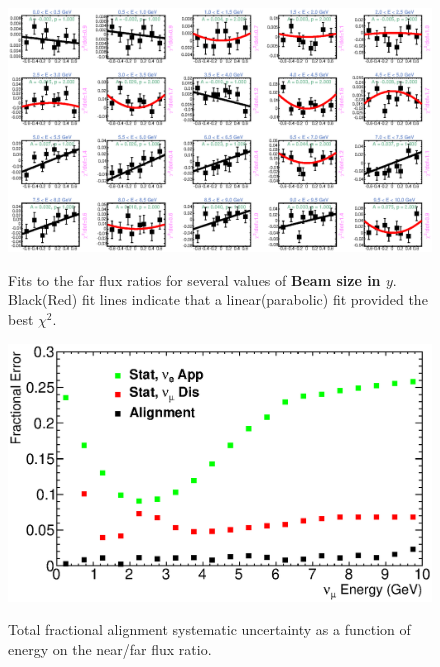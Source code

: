 {\begin{figure}[ht]
  \begin{center}
    {\includegraphics[width=5.0in]{figures/BeamSigmaY_far_fits.eps}}
  \end{center}
\caption{ Fits to the far flux ratios for several values of {\bf Beam size in $y$}. Black(Red) fit lines indicate that a linear(parabolic) fit provided the best $\chi^2$. }
\end{figure}

\begin{figure}[ht]
  \begin{center}
    {\includegraphics[width=6.0in]{figures/tot_error_nof.eps}}
  \end{center}
\caption{ Total fractional alignment systematic uncertainty as a function of energy on the near/far flux ratio. }
\end{figure}

}
